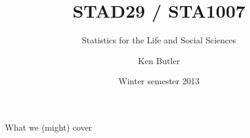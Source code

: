 \documentclass{beamer}
\title[Course Overheads] %
{STAD29 / STA1007}
\subtitle
{Statistics for the Life and Social Sciences}
\author %
{Ken Butler}
\date[Winter 2013] %
{Winter semester 2013}
\begin{document}


\begin{frame}
  \titlepage
\end{frame}

\begin{frame}{What we (might) cover}
  \tableofcontents
\end{frame}


















%
\end{document}
